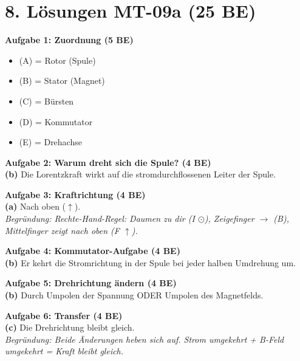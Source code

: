 \documentclass[11pt, a4paper]{article}
\newcommand{\stession}{09a}
\newcommand{\lsg}[1]{\textcolor{error}{\textbf{#1}}}
\begin{document}

\section*{8. Lösungen MT-\stession{} (25 BE)}

\begin{successbox}[Musterlösungen]

\textbf{Aufgabe 1: Zuordnung (5 BE)}
\begin{itemize}
    \item (A) = Rotor (Spule)
    \item (B) = Stator (Magnet)
    \item (C) = Bürsten
    \item (D) = Kommutator
    \item (E) = Drehachse
\end{itemize}

\textbf{Aufgabe 2: Warum dreht sich die Spule? (4 BE)}\\
\lsg{(b)} Die Lorentzkraft wirkt auf die stromdurchflossenen Leiter der Spule.

\textbf{Aufgabe 3: Kraftrichtung (4 BE)}\\
\lsg{(a)} Nach oben ($\uparrow$).\\
\textit{Begründung: Rechte-Hand-Regel: Daumen zu dir (I $\odot$), Zeigefinger $\rightarrow$ (B), Mittelfinger zeigt nach oben (F $\uparrow$).}

\textbf{Aufgabe 4: Kommutator-Aufgabe (4 BE)}\\
\lsg{(b)} Er kehrt die Stromrichtung in der Spule bei jeder halben Umdrehung um.

\textbf{Aufgabe 5: Drehrichtung ändern (4 BE)}\\
\lsg{(b)} Durch Umpolen der Spannung ODER Umpolen des Magnetfelds.

\textbf{Aufgabe 6: Transfer (4 BE)}\\
\lsg{(c)} Die Drehrichtung bleibt gleich.\\
\textit{Begründung: Beide Änderungen heben sich auf. Strom umgekehrt + B-Feld umgekehrt = Kraft bleibt gleich.}

\end{successbox}

\end{document}

